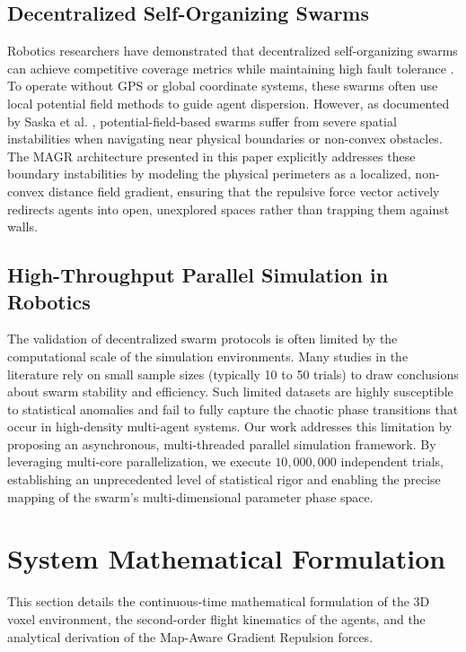 \documentclass[letterpaper, 10pt, conference]{IEEEtran}
\begin{document}
\subsection{Decentralized Self-Organizing Swarms}
Robotics researchers have demonstrated that decentralized self-organizing swarms can achieve competitive coverage metrics while maintaining high fault tolerance \cite{brambilla2013review}. To operate without GPS or global coordinate systems, these swarms often use local potential field methods to guide agent dispersion. However, as documented by Saska et al. \cite{saska2014cooperative}, potential-field-based swarms suffer from severe spatial instabilities when navigating near physical boundaries or non-convex obstacles. The MAGR architecture presented in this paper explicitly addresses these boundary instabilities by modeling the physical perimeters as a localized, non-convex distance field gradient, ensuring that the repulsive force vector actively redirects agents into open, unexplored spaces rather than trapping them against walls.

\subsection{High-Throughput Parallel Simulation in Robotics}
The validation of decentralized swarm protocols is often limited by the computational scale of the simulation environments. Many studies in the literature rely on small sample sizes (typically 10 to 50 trials) to draw conclusions about swarm stability and efficiency. Such limited datasets are highly susceptible to statistical anomalies and fail to fully capture the chaotic phase transitions that occur in high-density multi-agent systems. Our work addresses this limitation by proposing an asynchronous, multi-threaded parallel simulation framework. By leveraging multi-core parallelization, we execute $10{,}000{,}000$ independent trials, establishing an unprecedented level of statistical rigor and enabling the precise mapping of the swarm's multi-dimensional parameter phase space.

\section{System Mathematical Formulation}
\label{sec:formulation}

This section details the continuous-time mathematical formulation of the 3D voxel environment, the second-order flight kinematics of the agents, and the analytical derivation of the Map-Aware Gradient Repulsion forces.
\end{document}
